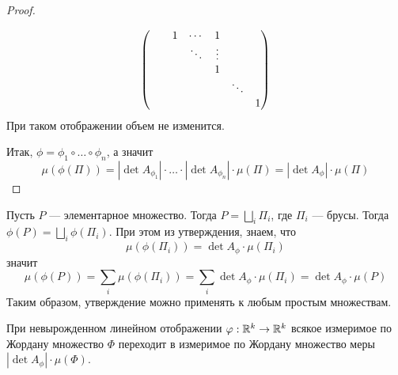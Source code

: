 \begin{proof}
\begin{enumerate}
\[\begin{pmatrix}
        \null & \null & 1 & \cdots & 1 & \null & \null \\
        \null & \null & \null & \ddots & \vdots & \null & \null \\
        \null & \null & \null & \null & 1 & \null & \null \\
        \null & \null & \null & \null & \null & \ddots & \null \\
        \null & \null & \null & \null & \null & \null & 1
        \end{pmatrix}
        \]
        При таком отображении объем не изменится.
    \end{enumerate}
    Итак, $\phi=\phi_1\circ\dots\circ\phi_n$, а значит
    \[\mu(\phi(\Pi))=|\det{A_{\phi_1}}|\cdot \dots\cdot |\det{A_{\phi_n}}|\cdot \mu(\Pi)=|\det{A_{\phi}}|\cdot \mu(\Pi)\]
\end{proof}
\begin{comm}
    Пусть $P$ --- элементарное множество. Тогда $P=\bigsqcup\limits_i \Pi_i$, где $\Pi_i$ --- брусы. Тогда $\phi(P)=\bigsqcup\limits_i \phi(\Pi_i)$. При этом из утверждения, знаем, что
    \[\mu(\phi(\Pi_i))=\det{A_{\phi}}\cdot \mu(\Pi_i)\]
    значит
    \[\mu(\phi(P))=\sum\limits_{i}\mu(\phi(\Pi_i))=\sum\limits_{i}\det{A_{\phi}}\cdot \mu(\Pi_i)=\det{A_{\phi}}\cdot \mu(P)\]
    Таким образом, утверждение можно применять к любым простым множествам.
\end{comm}
\begin{consequense}
    При невырожденном линейном отображении $\varphi: \mathbb{R}^k\to \mathbb{R}^k$ всякое измеримое по Жордану множество $\Phi$ переходит в измеримое по Жордану множество меры $|\det{A_{\phi}}|\cdot \mu(\Phi)$.
\end{consequense}
